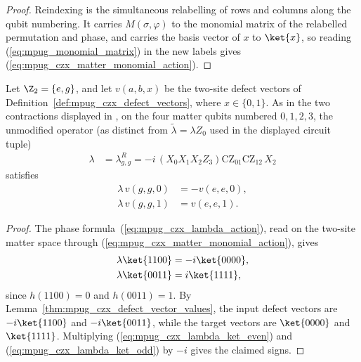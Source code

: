 \begin{proof}\leanok
    Reindexing is the simultaneous relabelling of rows and columns along the
    qubit numbering. It carries $M(\sigma,\varphi)$ to the monomial matrix of
    the relabelled permutation and phase, and carries the basis vector of $x$
    to $\ket{x}$, so reading (\ref{eq:mpug_monomial_matrix}) in the new labels
    gives (\ref{eq:mpug_czx_matter_monomial_action}).
\end{proof}

\begin{lemma}
    \label{thm:mpug_czx_unmodified_fusion}
    \leanok
    Let $\Z_2=\{e,g\}$, and let $v(a,b,x)$ be the two-site defect vectors
    of Definition~\ref{def:mpug_czx_defect_vectors}, where $x\in\{0,1\}$.
    As in the two contractions displayed in
    \cite[lines~4989--5067]{FrancoRubio2025MPUGauging}, on the four matter
    qubits numbered $0,1,2,3$, the unmodified operator (as distinct from
    $\tilde\lambda=\lambda Z_0$ used in the displayed circuit tuple)
    \begin{align}
        \lambda & =\lambda^R_{g,g}
        =-i\,(X_0X_1X_2Z_3) \mathrm{CZ}_{01}\mathrm{CZ}_{12}\,X_2
    \end{align}
    satisfies
    \begin{align}
        \lambda\,v(g,g,0) & =-v(e,e,0), \\
        \lambda\,v(g,g,1) & =v(e,e,1).
    \end{align}
\end{lemma}

\begin{proof}\leanok
    The phase formula~(\ref{eq:mpug_czx_lambda_action}), read on the two-site
    matter space through (\ref{eq:mpug_czx_matter_monomial_action}), gives
    \begin{align}
        \lambda\ket{1100} & =-i\ket{0000},
        \label{eq:mpug_czx_lambda_ket_even} \\
        \lambda\ket{0011} & =i\ket{1111},
        \label{eq:mpug_czx_lambda_ket_odd}
    \end{align}
    since $h(1100)=0$ and $h(0011)=1$.
    By Lemma~\ref{thm:mpug_czx_defect_vector_values}, the input defect
    vectors are $-i\ket{1100}$ and $-i\ket{0011}$, while the target
    vectors are $\ket{0000}$ and $\ket{1111}$. Multiplying
    (\ref{eq:mpug_czx_lambda_ket_even}) and
    (\ref{eq:mpug_czx_lambda_ket_odd}) by $-i$ gives the claimed signs.
\end{proof}

